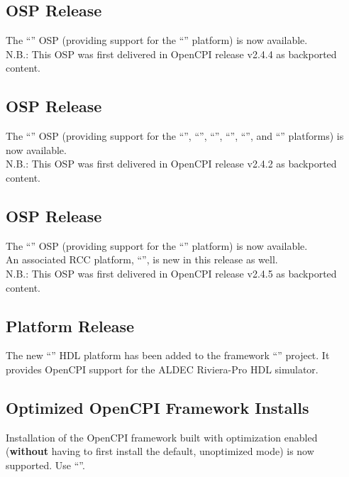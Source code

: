 \subsection{ OSP Release}
\label{sec:25_n3xx}
The ``'' OSP (providing support for the ``'' platform) is now available.\\

N.B.: This OSP was first delivered in OpenCPI release v2.4.4 as backported content.\\

\subsection{ OSP Release}
\label{sec:25_avnet}
The ``'' OSP (providing support for the ``'', ``'', ``'', ``'', ``'', and ``'' platforms) is now available.\\

N.B.: This OSP was first delivered in OpenCPI release v2.4.2 as backported content.\\

\subsection{ OSP Release}
\label{sec:25_epiq}
The ``'' OSP (providing support for the ``'' platform) is now available.\\

An associated RCC platform, ``'', is new in this release as well.\\

N.B.: This OSP was first delivered in OpenCPI release v2.4.5 as backported content.\\

\subsection{ Platform Release}
\label{sec:25_riviera}
The new ``'' HDL platform has been added to the framework ``'' project.  It provides OpenCPI support for the ALDEC Riviera-Pro HDL simulator.\\

\subsection{Optimized OpenCPI Framework Installs}
\label{sec:25_fwopt}
Installation of the OpenCPI framework built with optimization enabled (\textbf{without} having to first install the default, unoptimized mode) is now supported.  Use ``''.\\

